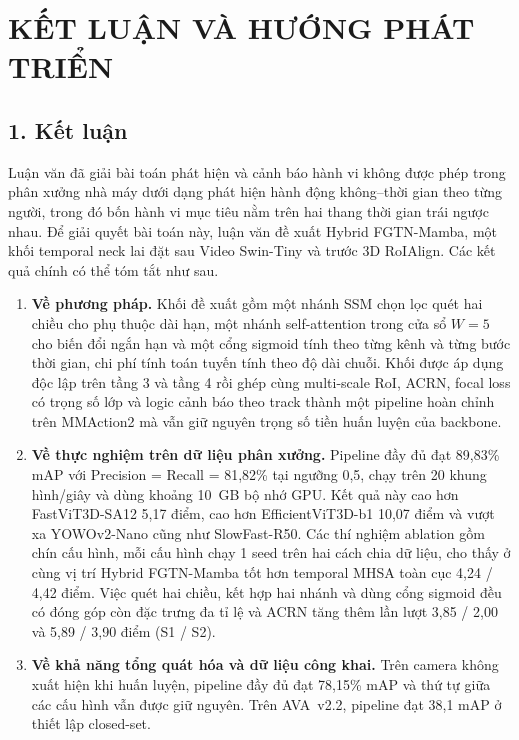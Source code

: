 \chapter*{KẾT LUẬN VÀ HƯỚNG PHÁT TRIỂN}
\label{ch:conclusion}

\section*{1. Kết luận}

Luận văn đã giải bài toán phát hiện và cảnh báo hành vi không được phép trong phân xưởng nhà máy dưới dạng phát hiện hành động không--thời gian theo từng người, trong đó bốn hành vi mục tiêu nằm trên hai thang thời gian trái ngược nhau. Để giải quyết bài toán này, luận văn đề xuất Hybrid FGTN-Mamba, một khối temporal neck lai đặt sau Video Swin-Tiny và trước 3D RoIAlign. Các kết quả chính có thể tóm tắt như sau.

\begin{enumerate}
  \item \textbf{Về phương pháp.} Khối đề xuất gồm một nhánh SSM chọn lọc quét hai chiều cho phụ thuộc dài hạn, một nhánh self-attention trong cửa sổ $W = 5$ cho biến đổi ngắn hạn và một cổng sigmoid tính theo từng kênh và từng bước thời gian, chi phí tính toán tuyến tính theo độ dài chuỗi. Khối được áp dụng độc lập trên tầng 3 và tầng 4 rồi ghép cùng multi-scale RoI, ACRN, focal loss có trọng số lớp và logic cảnh báo theo track thành một pipeline hoàn chỉnh trên MMAction2 mà vẫn giữ nguyên trọng số tiền huấn luyện của backbone.
  \item \textbf{Về thực nghiệm trên dữ liệu phân xưởng.} Pipeline đầy đủ đạt 89,83\% mAP với Precision = Recall = 81,82\% tại ngưỡng 0,5, chạy trên 20 khung hình/giây và dùng khoảng 10~GB bộ nhớ GPU. Kết quả này cao hơn FastViT3D-SA12 5,17 điểm, cao hơn EfficientViT3D-b1 10,07 điểm và vượt xa YOWOv2-Nano cũng như SlowFast-R50. Các thí nghiệm ablation gồm chín cấu hình, mỗi cấu hình chạy 1 seed trên hai cách chia dữ liệu, cho thấy ở cùng vị trí Hybrid FGTN-Mamba tốt hơn temporal MHSA toàn cục 4,24 / 4,42 điểm. Việc quét hai chiều, kết hợp hai nhánh và dùng cổng sigmoid đều có đóng góp còn đặc trưng đa tỉ lệ và ACRN tăng thêm lần lượt 3,85 / 2,00 và 5,89 / 3,90 điểm (S1 / S2).
  \item \textbf{Về khả năng tổng quát hóa và dữ liệu công khai.} Trên camera không xuất hiện khi huấn luyện, pipeline đầy đủ đạt 78,15\% mAP và thứ tự giữa các cấu hình vẫn được giữ nguyên. Trên AVA~v2.2, pipeline đạt 38,1 mAP ở thiết lập closed-set.
\end{enumerate}

